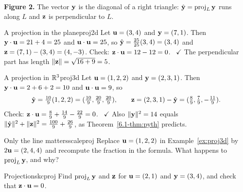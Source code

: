 \documentclass[11pt]{article}
\begin{document}
\begin{center}
\end{center}

\noindent\textbf{Figure 2.} The vector $\mathbf{y}$ is the diagonal of a right triangle: $\hat{\mathbf{y}}=\operatorname{proj}_L\mathbf{y}$ runs along $L$ and $\mathbf{z}$ is perpendicular to $L$.

\begin{exmp}{A projection in the plane}{proj2d}
Let $\mathbf{u}=(3,4)$ and $\mathbf{y}=(7,1)$. Then $\mathbf{y}\cdot\mathbf{u}=21+4=25$ and $\mathbf{u}\cdot\mathbf{u}=25$, so $\hat{\mathbf{y}}=\tfrac{25}{25}(3,4)=(3,4)$ and $\mathbf{z}=(7,1)-(3,4)=(4,-3)$. Check: $\mathbf{z}\cdot\mathbf{u}=12-12=0$. \ $\checkmark$ The perpendicular part has length $\lVert\mathbf{z}\rVert=\sqrt{16+9}=5$.
\end{exmp}

\begin{exmp}{A projection in $\mathbb{R}^3$}{proj3d}
Let $\mathbf{u}=(1,2,2)$ and $\mathbf{y}=(2,3,1)$. Then $\mathbf{y}\cdot\mathbf{u}=2+6+2=10$ and $\mathbf{u}\cdot\mathbf{u}=9$, so
\[
\hat{\mathbf{y}}=\tfrac{10}{9}(1,2,2)=(\tfrac{10}{9},\tfrac{20}{9},\tfrac{20}{9}),\qquad\mathbf{z}=(2,3,1)-\hat{\mathbf{y}}=(\tfrac{8}{9},\tfrac{7}{9},-\tfrac{11}{9}).
\]
Check: $\mathbf{z}\cdot\mathbf{u}=\tfrac{8}{9}+\tfrac{14}{9}-\tfrac{22}{9}=0$. \ $\checkmark$ Also $\lVert\mathbf{y}\rVert^2=14$ equals $\lVert\hat{\mathbf{y}}\rVert^2+\lVert\mathbf{z}\rVert^2=\tfrac{100}{9}+\tfrac{26}{9}$, as Theorem~\ref{6.1-thm:pyth} predicts.
\end{exmp}

\begin{think}{Only the line matters}{scaleproj}
Replace $\mathbf{u}=(1,2,2)$ in Example~\ref{ex:proj3d} by $2\mathbf{u}=(2,4,4)$ and recompute the fraction in the formula. What happens to $\operatorname{proj}_L\mathbf{y}$, and why?
\end{think}

\begin{kc}{Projections}{kcproj}
Find $\operatorname{proj}_L\mathbf{y}$ and $\mathbf{z}$ for $\mathbf{u}=(2,1)$ and $\mathbf{y}=(3,4)$, and check that $\mathbf{z}\cdot\mathbf{u}=0$.
\end{kc}
\end{document}
